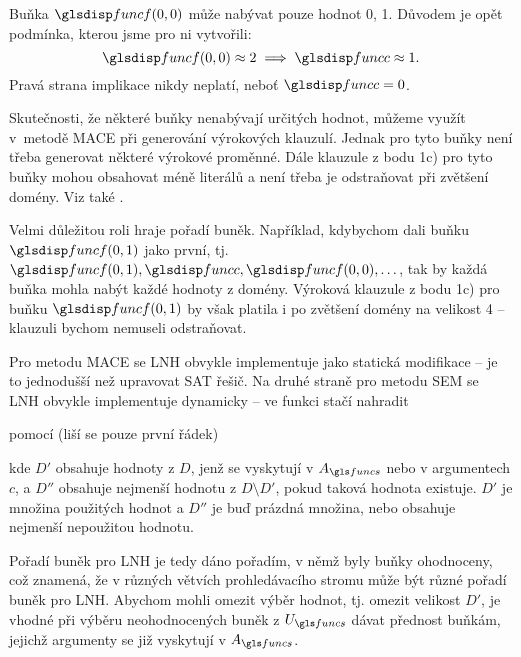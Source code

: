 Buňka $\func(0, 0)$ může nabývat pouze hodnot 0, 1. Důvodem
je opět podmínka, kterou jsme pro ni vytvořili:
\[
  \func(0, 0) \approx 2 \implies \funcC \approx 1.
\]
Pravá strana implikace nikdy neplatí, neboť $\funcC = 0$.

Skutečnosti, že některé buňky nenabývají určitých hodnot,
můžeme využít v~metodě MACE při generování výrokových klauzulí.
Jednak pro tyto buňky není třeba generovat některé výrokové proměnné.
Dále klauzule z bodu 1c) pro tyto buňky mohou obsahovat méně literálů
a není třeba je odstraňovat při zvětšení domény. Viz také
\cite{claessen03paradox}.

Velmi důležitou roli hraje pořadí buněk. Například, kdybychom dali
buňku $\func(0, 1)$ jako první, tj.
$\func(0, 1), \funcC, \func(0, 0), \ldots$,
tak by každá buňka mohla nabýt každé hodnoty z domény.
Výroková klauzule z bodu 1c) pro buňku $\func(0, 1)$
by však platila i po zvětšení domény na velikost 4 -- klauzuli
bychom nemuseli odstraňovat.

Pro metodu MACE se LNH obvykle implementuje jako statická modifikace
-- je to jednodušší než upravovat SAT řešič.
Na druhé straně pro metodu SEM se LNH obvykle
implementuje dynamicky -- ve funkci  stačí nahradit

\medskip
\begin{algorithmic}
    \State {}
  \EndFor
\end{algorithmic}
\medskip

\noindent pomocí (liší se pouze první řádek)

\medskip
\begin{algorithmic}
    \State {}
  \EndFor
\end{algorithmic}
\medskip

\noindent
kde $D'$ obsahuje hodnoty z $D$, jenž se vyskytují v $A_\funcs$ nebo
v argumentech $c$,
a $D''$ obsahuje nejmenší hodnotu z $D \setminus D'$,
pokud taková hodnota existuje.
$D'$ je množina použitých hodnot a $D''$ je buď prázdná množina,
nebo obsahuje nejmenší nepoužitou hodnotu.

Pořadí buněk pro LNH je tedy dáno pořadím, v němž byly
buňky ohodnoceny, což znamená, že v různých větvích
prohledávacího stromu může být různé pořadí buněk pro LNH.
Abychom mohli omezit výběr hodnot, tj. omezit velikost $D'$,
je vhodné při výběru neohodnocených buněk z $U_\funcs$
dávat přednost buňkám, jejichž argumenty se již vyskytují v $A_\funcs$.


